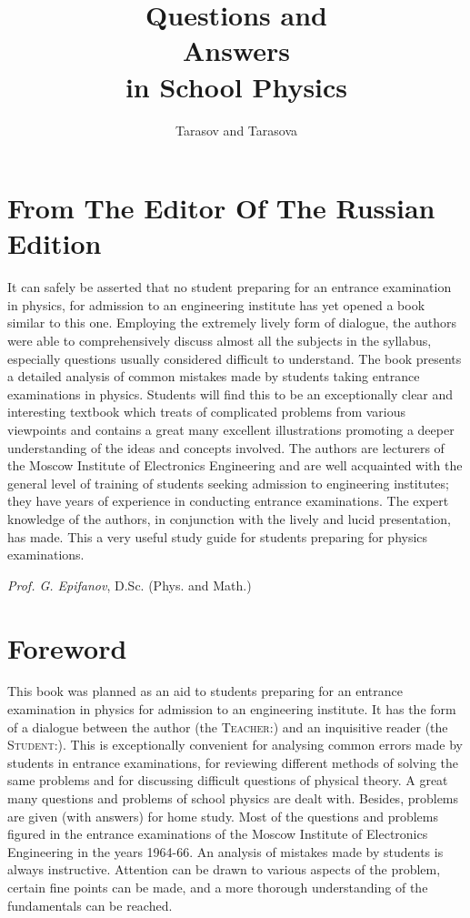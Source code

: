 \documentclass[a4paper,sfsidenotes]{tufte-book}
\title{\indent Questions and \\ Answers \\in School Physics}
\author{Tarasov and Tarasova}
\date{}
\begin{document}
\frontmatter
\maketitle

\setcounter{tocdepth}{3}
\tableofcontents
\vspace*{1cm}

\chapter{From The Editor Of The Russian Edition}
\label{preface}

It can safely be asserted that no student preparing for an entrance examination in physics, for admission to an engineering institute has yet opened a book similar to this one. Employing the extremely lively form of dialogue, the authors were able to comprehensively discuss almost all the subjects in the syllabus, especially questions usually considered difficult to understand. The book presents a detailed analysis of common mistakes made by students taking entrance examinations in physics. Students will find this to be an exceptionally clear and interesting textbook which treats of complicated problems from various viewpoints and contains a great many excellent illustrations promoting a deeper understanding of the ideas and concepts involved. The authors are lecturers of the Moscow Institute of Electronics Engineering and are well acquainted with the general level of training of students seeking admission to engineering institutes; they have years of experience in conducting
entrance examinations. The expert knowledge of the authors, in conjunction with the lively and lucid presentation, has made. This a very useful study guide for students preparing for physics
examinations.  \\
\begin{flushright}
\emph{Prof. G. Epifanov}, D.Sc.  (Phys. and Math.)
\end{flushright}

\chapter{Foreword}
\label{foreword}

This book was planned as an aid to students preparing for an entrance examination in physics for admission to an engineering institute. It has the form of a dialogue between the author (the \textsc{Teacher:}) and an inquisitive reader (the  \textsc{Student:}). This is exceptionally convenient for analysing common errors made by students in entrance examinations, for reviewing different methods of solving the same problems and for discussing difficult questions of physical theory.
A great many questions and problems of school physics are dealt with. Besides, problems are given (with answers) for home study. Most of the questions and problems figured in the entrance examinations of the Moscow Institute of Electronics Engineering in the years 1964-66. An analysis of mistakes made by students is always instructive. Attention can be drawn to various aspects of the
problem, certain fine points can be made, and a more thorough understanding of the fundamentals can be reached.
\end{document}
